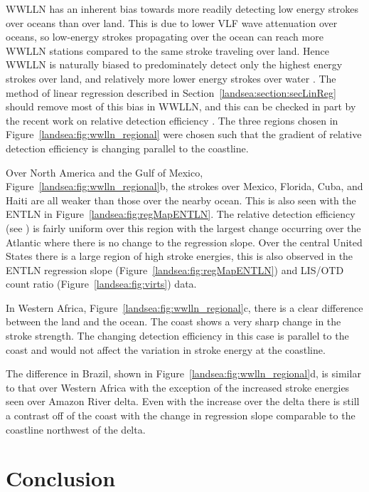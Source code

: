 WWLLN has an inherent bias towards more readily detecting low energy strokes over oceans than over land.
This is due to lower VLF wave attenuation over oceans, so low-energy strokes propagating over the ocean can reach more WWLLN stations compared to the same stroke traveling over land.
Hence WWLLN is naturally biased to predominately detect only the highest energy strokes over land, and relatively more lower energy strokes over water \citep{Hutchins2012}.
The method of linear regression described in Section~\ref{landsea:section:secLinReg} should remove most of this bias in WWLLN, and this can be checked in part by the recent work on relative detection efficiency \citep{Hutchins2012a}.
The three regions chosen in Figure~\ref{landsea:fig:wwlln_regional} were chosen such that the gradient of relative detection efficiency is changing parallel to the coastline.

Over North America and the Gulf of Mexico, Figure~\ref{landsea:fig:wwlln_regional}b, the strokes over Mexico, Florida, Cuba, and Haiti are all weaker than those over the nearby ocean.
This is also seen with the ENTLN in Figure~\ref{landsea:fig:regMapENTLN}.
The relative detection efficiency (see \citet{Hutchins2012a}) is fairly uniform over this region with the largest change occurring over the Atlantic where there is no change to the regression slope.
Over the central United States there is a large region of high stroke energies, this is also observed in the ENTLN regression slope (Figure~\ref{landsea:fig:regMapENTLN}) and LIS/OTD count ratio (Figure~\ref{landsea:fig:virts}) data. 

In Western Africa, Figure~\ref{landsea:fig:wwlln_regional}c, there is a clear difference between the land and the ocean.
The coast shows a very sharp change in the stroke strength.
The changing detection efficiency in this case is parallel to the coast and would not affect the variation in stroke energy at the coastline.

The difference in Brazil, shown in Figure~\ref{landsea:fig:wwlln_regional}d, is similar to that over Western Africa with the exception of the increased stroke energies seen over Amazon River delta.
Even with the increase over the delta there is still a contrast off of the coast with the change in regression slope comparable to the coastline northwest of the delta.

\section{Conclusion}

